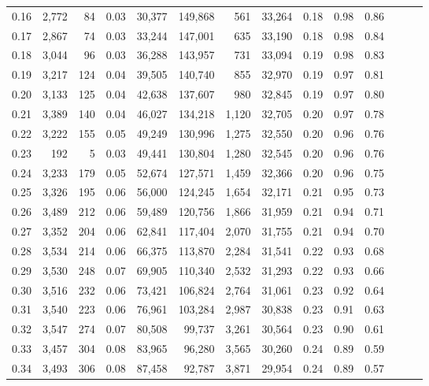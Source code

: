 \begin{tabular}{rrrrrrrrrrrrrr}
0.16 &  2,772 &   84 &  0.03 &   30,377 &  149,868 &     561 &  33,264 &  0.18 &  0.98 &      0.86 \\
0.17 &  2,867 &   74 &  0.03 &   33,244 &  147,001 &     635 &  33,190 &  0.18 &  0.98 &      0.84 \\
0.18 &  3,044 &   96 &  0.03 &   36,288 &  143,957 &     731 &  33,094 &  0.19 &  0.98 &      0.83 \\
0.19 &  3,217 &  124 &  0.04 &   39,505 &  140,740 &     855 &  32,970 &  0.19 &  0.97 &      0.81 \\
0.20 &  3,133 &  125 &  0.04 &   42,638 &  137,607 &     980 &  32,845 &  0.19 &  0.97 &      0.80 \\
0.21 &  3,389 &  140 &  0.04 &   46,027 &  134,218 &   1,120 &  32,705 &  0.20 &  0.97 &      0.78 \\
0.22 &  3,222 &  155 &  0.05 &   49,249 &  130,996 &   1,275 &  32,550 &  0.20 &  0.96 &      0.76 \\
0.23 &    192 &    5 &  0.03 &   49,441 &  130,804 &   1,280 &  32,545 &  0.20 &  0.96 &      0.76 \\
0.24 &  3,233 &  179 &  0.05 &   52,674 &  127,571 &   1,459 &  32,366 &  0.20 &  0.96 &      0.75 \\
0.25 &  3,326 &  195 &  0.06 &   56,000 &  124,245 &   1,654 &  32,171 &  0.21 &  0.95 &      0.73 \\
0.26 &  3,489 &  212 &  0.06 &   59,489 &  120,756 &   1,866 &  31,959 &  0.21 &  0.94 &      0.71 \\
0.27 &  3,352 &  204 &  0.06 &   62,841 &  117,404 &   2,070 &  31,755 &  0.21 &  0.94 &      0.70 \\
0.28 &  3,534 &  214 &  0.06 &   66,375 &  113,870 &   2,284 &  31,541 &  0.22 &  0.93 &      0.68 \\
0.29 &  3,530 &  248 &  0.07 &   69,905 &  110,340 &   2,532 &  31,293 &  0.22 &  0.93 &      0.66 \\
0.30 &  3,516 &  232 &  0.06 &   73,421 &  106,824 &   2,764 &  31,061 &  0.23 &  0.92 &      0.64 \\
0.31 &  3,540 &  223 &  0.06 &   76,961 &  103,284 &   2,987 &  30,838 &  0.23 &  0.91 &      0.63 \\
0.32 &  3,547 &  274 &  0.07 &   80,508 &   99,737 &   3,261 &  30,564 &  0.23 &  0.90 &      0.61 \\
0.33 &  3,457 &  304 &  0.08 &   83,965 &   96,280 &   3,565 &  30,260 &  0.24 &  0.89 &      0.59 \\
0.34 &  3,493 &  306 &  0.08 &   87,458 &   92,787 &   3,871 &  29,954 &  0.24 &  0.89 &      0.57 \\

\end{tabular}
